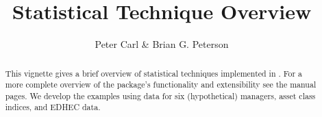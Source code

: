 \documentclass[12pt,letterpaper,english]{article}
\begin{document}
\title{ Statistical Technique Overview}
\author {Peter Carl \& Brian G. Peterson}


\makeatletter
\makeatother
\maketitle

\begin{abstract}
  This vignette gives a brief overview of statistical techniques implemented
  in . For a more complete overview of the package's functionality
  and extensibility see the manual pages.  We develop the examples using data
  for six (hypothetical) managers, asset class indices, and EDHEC data.
\end{abstract}

\end{document}
